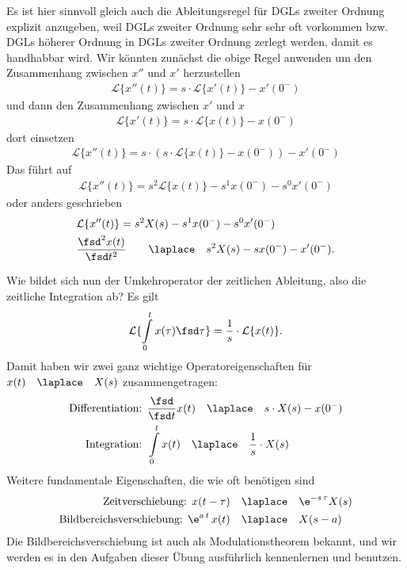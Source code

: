 Es ist hier sinnvoll gleich auch die Ableitungsregel für DGLs zweiter Ordnung
explizit anzugeben, weil DGLs zweiter Ordnung sehr sehr oft vorkommen bzw.
DGLs höherer Ordnung in DGLs zweiter Ordnung zerlegt werden, damit es handhabbar
wird.
%
Wir könnten zunächst die obige Regel  anwenden um den
Zusammenhang  zwischen $x''$ und $x'$ herzustellen
\begin{align}
\mathcal{L}\{x''(t)\}  = s \cdot \mathcal{L}\{x'(t)\} - x'(0^-)
\end{align}
und dann den Zusammenhang zwischen $x'$ und $x$
\begin{align}
\mathcal{L}\{x'(t)\}  = s \cdot \mathcal{L}\{x(t)\} - x(0^-)
\end{align}
dort einsetzen
\begin{align}
\mathcal{L}\{x''(t)\}  = s \cdot (s \cdot \mathcal{L}\{x(t)\} - x(0^-)) - x'(0^-)
\end{align}
Das führt auf
\begin{align}
\mathcal{L}\{x''(t)\}  = s^2 \mathcal{L}\{x(t)\} - s^1 x(0^-) - s^0 x'(0^-)
\end{align}
oder anders geschrieben
\begin{align}
&\mathcal{L}\{x''(t)\} = s^2 X(s) - s^1 x(0^-) - s^0 x'(0^-)\\
&\frac{\fsd^2 x(t)}{\fsd t^2} \qquad \laplace \quad s^2 X(s) - s x(0^-) - x'(0^-).
\end{align}

Wie bildet sich nun der Umkehroperator der zeitlichen Ableitung, also die zeitliche
Integration ab? Es gilt
\begin{align}
\mathcal{L}\{\int\limits_{0}^{t} x(\tau)\fsd \tau\}  = \frac{1}{s} \cdot \mathcal{L}\{x(t)\}.
\end{align}
Damit haben wir zwei ganz wichtige Operatoreigenschaften für
$x(t)\quad\laplace\quad X(s)$ zusammengetragen:
\begin{align}
\text{Differentiation:   } &\frac{\fsd }{\fsd t}  x(t) \quad\laplace\quad s\cdot X(s) - x(0^-)\\
\text{Integration:   } &\int\limits_{0}^{t} x(t) \quad\laplace\quad \frac{1}{s} \cdot X(s)
\end{align}
%
Weitere fundamentale Eigenschaften, die wie oft benötigen sind
\begin{align}
\text{Zeitverschiebung:   } x(t-\tau)& \quad\laplace\quad \e^{-s\,\tau} X(s)\\
\text{Bildbereichsverschiebung:   } \e^{a\,t} \, x(t)& \quad\laplace\quad X(s-a)
\end{align}
Die Bildbereichsverschiebung ist auch als Modulationstheorem bekannt,
und wir werden es in den Aufgaben dieser Übung ausführlich kennenlernen und
benutzen.


